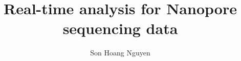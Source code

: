 \title{
Real-time analysis for Nanopore sequencing data}
\author{Son Hoang Nguyen}



\titlepage

\cleardoublepage

\cleardoublepage
\tableofcontents
\cleardoublepage
\listoffigures
\cleardoublepage
\listoftables
\cleardoublepage

